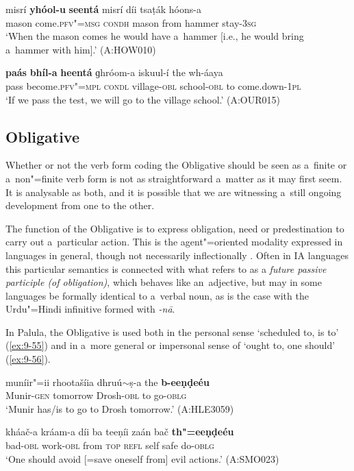 \begin{exe}
\ex
\label{ex:9-53}
\gll misrí \textbf{yhóol-u} \textbf{seentá} misrí díi tsaṭák hóons-a \\
mason come.\textsc{pfv"=msg} \textsc{condh} mason from hammer stay-\textsc{3sg} \\
\glt `When the mason comes he would have a~hammer [i.e., he would bring a~hammer with him].' (A:HOW010)

\ex
\label{ex:9-54}
\gll \textbf{paás} \textbf{bhíl-a} \textbf{heentá}  ɡhróom-a iskuul-í the wh-áaya\\
pass become.\textsc{pfv"=mpl} \textsc{condl}  village-\textsc{obl} school-\textsc{obl} to come.down-\textsc{1pl}\\
\glt `If we pass the test, we will go to the village school.' (A:OUR015)
\end{exe}

\subsection{Obligative}
\label{subsec:9-2-3}

Whether or not the verb form coding the Obligative should be seen as a~finite or a~non"=finite verb form is not as straightforward a~matter as it may first seem. It is analysable as both, and it is possible that we are witnessing a~still ongoing development from one to the other. 



The function of the Obligative is to express obligation, need or predestination to carry out a~particular action. This is the agent"=oriented modality expressed in languages in general, though not necessarily inflectionally \citep[177--187]{bybeeetal1994}. Often in IA languages this particular semantics is connected with what \citet[322]{masica1991} refers to as a \textit{future passive participle (of obligation)}, which behaves like an~adjective, but may in some languages be formally identical to a~verbal noun, as is the case with the Urdu"=Hindi infinitive formed with \textit{-nā}. 



In Palula, the Obligative is used both in the personal sense `scheduled to, is to' (\ref{ex:9-55}) and in a~more general or impersonal sense of `ought to, one should' (\ref{ex:9-56}).

\begin{exe}
\ex
\label{ex:9-55}
\gll muníir"=ii rhootašíia dhruú$\sim$ṣ-a the \textbf{b-eeṇḍeéu} \\
Munir-\textsc{gen } tomorrow Drosh-\textsc{obl} to go-\textsc{oblg} \\
\glt `Munir has/is to go to Drosh tomorrow.' (A:HLE3059)

\ex
\label{ex:9-56}
\gll kháač-a kráam-a díi ba teeṇíi zaán bač \textbf{th"=eeṇḍeéu} \\
bad-\textsc{obl} work-\textsc{obl} from \textsc{top} \textsc{refl} self safe do-\textsc{oblg} \\
\glt `One should avoid [=save oneself from] evil actions.' (A:SMO023)
\end{exe}

